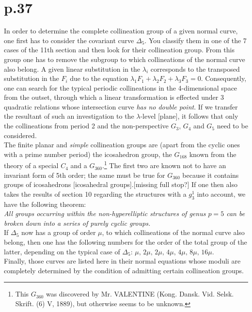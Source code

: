 \documentclass[leqno]{article}
\begin{document}
\section{p.37}
In order to determine the complete collineation group of a given normal curve, one first has to consider the covariant curve $\Delta_5$. You classify them in one of the 7 cases of the 11th section and then look for their collineation group. From this group one has to remove the subgroup to which collineations of the normal curve also belong. A given linear substitution in the $\lambda_i$ corresponds to the transposed substitution in the $F_i$ due to the equation $\lambda_1 F_1 + \lambda_2 F_2 + \lambda_3 F_3 = 0$. Consequently, one can search for the typical periodic collineations in the 4-dimensional space from the outset, through which a linear transformation is effected under 3 quadratic relations whose intersection curve \textit{has no double point}. If we transfer the resultant of such an investigation to the $\lambda$-level [plane], it follows that only the collineations from period 2 and the non-perspective $G_3$, $G_4$ and $G_5$ need to be considered. \\
The finite planar and \textit{simple} collineation groups are (apart from the cyclic ones with a prime number period) the icosahedron group, the $G_{168}$ known from the theory of a special $C_4$ and a $G_{360}$.\footnote{This $G_{360}$ was discovered by Mr. VALENTINE (Kong. Dansk. Vid. Selsk. Skrift. (6) V, 1889), but otherwise seems to be unknown.} The first two are known not to have an invariant form of 5th order; the same must be true for $G_{360}$ because it contains groups of icosahedrons [icosahedral groups].[missing full stop?] If one then also takes the results of section 10 regarding the structures with a $g_3^1$ into account, we have the following theorem: \\
\textit{All groups occurring within the non-hyperelliptic structures of genus $p=5$ can be broken down into a series of purely cyclic groups.} \\
If $\Delta_5$ now has a group of order $\mu$, to which collineations of the normal curve also belong, then one has the following numbers for the order of the total group of the latter, depending on the typical case of $\Delta_5$: $\mu, \, 2\mu, \, 2\mu, \, 4\mu, \, 4\mu, \, 8\mu, \, 16\mu$. \\
Finally, those curves are listed here in their normal equations whose moduli are completely determined by the condition of admitting certain collineation groups.
\end{document}
